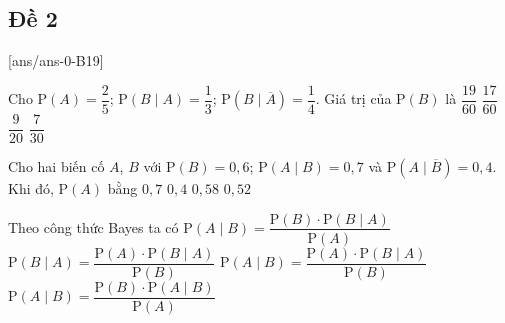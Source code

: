 \subsection{Đề 2}
[ans/ans-0-B19]
\caulc
\begin{ex}%
	Cho $\mathrm{P}(A)=\dfrac{2}{5}$; $\mathrm{P}(B \mid A)=\dfrac{1}{3}$; $\mathrm{P}(B \mid \overline{A})=\dfrac{1}{4}$. Giá trị của $\mathrm{P}(B)$ là 
	\choice
	{$\dfrac{19}{60}$}
	{\True  $\dfrac{17}{60}$}
	{$\dfrac{9}{20}$}
	{$\dfrac{7}{30}$}
\end{ex}
\begin{ex}%
Cho hai biến cố $A$, $B$ với $\mathrm{P}(B)=0{,}6$; $\mathrm{P}(A \mid B)=0{,}7$ và $\mathrm{P}(A \mid \overline{B})=0{,}4$. Khi đó, $\mathrm{P}(A)$ bằng 
\choice
{$0{,}7$}
{$0{,}4$}
{\True  $0{,}58$}
{$0{,}52$}
\end{ex}
\begin{ex}%
	Theo công thức Bayes ta có 
	\choice
	{$\mathrm{P}(A \mid B)=\dfrac{\mathrm{P}(B)\cdot \mathrm{P}(B \mid A)}{\mathrm{P}(A)}$}
	{$\mathrm{P}(B \mid A)=\dfrac{\mathrm{P}(A)\cdot \mathrm{P}(B \mid A)}{\mathrm{P}(B)}$}
	{\True $\mathrm{P}(A \mid B)=\dfrac{\mathrm{P}(A)\cdot \mathrm{P}(B \mid A)}{\mathrm{P}(B)}$}
	{$\mathrm{P}(A \mid B)=\dfrac{\mathrm{P}(B)\cdot \mathrm{P}(A \mid B)}{\mathrm{P}(A)}$}
\end{ex}


